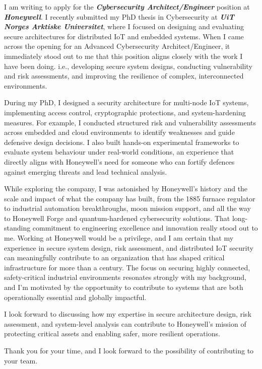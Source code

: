 

I am writing to apply for the \textbf{\emph{Cybersecurity Architect/Engineer}} position at \textbf{\emph{Honeywell}}. I recently submitted my PhD thesis in Cybersecurity at \textbf{\emph{UiT Norges Arktiske Universitet}}, where I focused on designing and evaluating secure architectures for distributed IoT and embedded systems. When I came across the opening for an Advanced Cybersecurity Architect/Engineer, it immediately stood out to me that this position aligns closely with the work I have been doing. i.e., developing secure system designs, conducting vulnerability and risk assessments, and improving the resilience of complex, interconnected environments.

During my PhD, I designed a security architecture for multi-node IoT systems, implementing access control, cryptographic protections, and system-hardening measures. For example, I conducted structured risk and vulnerability assessments across embedded and cloud environments to identify weaknesses and guide defensive design decisions. I also built hands-on experimental frameworks to evaluate system behaviour under real-world conditions, an experience that directly aligns with Honeywell’s need for someone who can fortify defences against emerging threats and lead technical analysis.

While exploring the company, I was astonished by Honeywell’s history and the scale and impact of what the company has built, from the 1885 furnace regulator to industrial automation breakthroughs, moon mission support, and all the way to Honeywell Forge and quantum-hardened cybersecurity solutions. That long-standing commitment to engineering excellence and innovation really stood out to me. Working at Honeywell would be a privilege, and I am certain that my experience in secure system design, risk assessment, and distributed IoT security can meaningfully contribute to an organization that has shaped critical infrastructure for more than a century. The focus on securing highly connected, safety-critical industrial environments resonates strongly with my background, and I’m motivated by the opportunity to contribute to systems that are both operationally essential and globally impactful.

I look forward to discussing how my expertise in secure architecture design, risk assessment, and system-level analysis can contribute to Honeywell's mission of protecting critical assets and enabling safer, more resilient operations.

Thank you for your time, and I look forward to the possibility of contributing to your team.